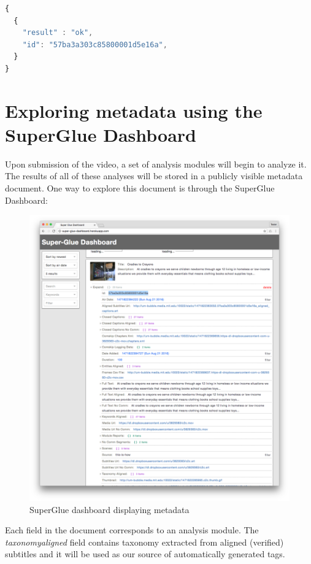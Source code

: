 \begin{lstlisting}[language=javascript]
{
  {
    "result" : "ok",
    "id": "57ba3a303c85800001d5e16a",
  }
}
\end{lstlisting}

\section{Exploring metadata using the SuperGlue Dashboard}

Upon submission of the video, a set of analysis modules will begin to analyze it. The results of all of these analyses will be stored in a publicly visible metadata document. One way to explore this document is through the SuperGlue Dashboard:

\begin{figure}[thpb]
  \centering
  \includegraphics[width=\textwidth]{figures/super-glue-dashboard.png}
  \caption{SuperGlue dashboard displaying metadata}
  \label{fig_superglue_dashboard}
\end{figure}

Each field in the document corresponds to an analysis module. The \textit{taxonomyaligned} field contains taxonomy extracted from aligned (verified) subtitles and it will be used as our source of automatically generated tags. 

